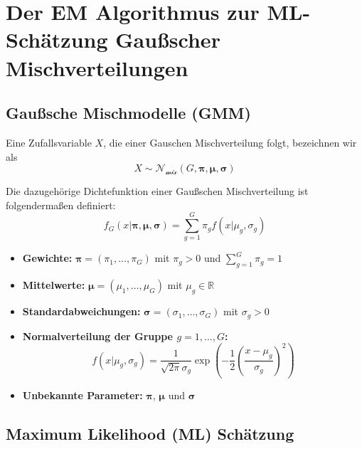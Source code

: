 \documentclass[
  ngerman,
]{book}
\providecommand{\tightlist}{%
  \setlength{\itemsep}{0pt}\setlength{\parskip}{0pt}}
\begin{document}
\hypertarget{der-em-algorithmus-zur-ml-schuxe4tzung-gauuxdfscher-mischverteilungen}{%
\section{Der EM Algorithmus zur ML-Schätzung Gaußscher Mischverteilungen}\label{der-em-algorithmus-zur-ml-schuxe4tzung-gauuxdfscher-mischverteilungen}}

\hypertarget{gauuxdfsche-mischmodelle-gmm}{%
\subsection{Gaußsche Mischmodelle (GMM)}\label{gauuxdfsche-mischmodelle-gmm}}

Eine Zufallsvariable \(X\), die einer Gauschen Mischverteilung folgt, bezeichnen wir als
\[
X\sim\mathcal{N}_{\mathcal{mix}}(G,\boldsymbol{\pi},\boldsymbol{\mu},\boldsymbol{\sigma})
\]

Die dazugehörige Dichtefunktion einer Gaußschen Mischverteilung ist folgendermaßen definiert:
\begin{equation}
f_G(x|\boldsymbol{\pi},\boldsymbol{\mu},\boldsymbol{\sigma})=\sum_{g=1}^G\pi_gf(x|\mu_g,\sigma_g) \label{eq:GMMdens}
\end{equation}

\begin{itemize}
\tightlist
\item
  \textbf{Gewichte:} \(\boldsymbol{\pi}=(\pi_1,\dots,\pi_G)\) mit \(\pi_g>0\) und \(\sum_{g=1}^G\pi_g=1\)
\item
  \textbf{Mittelwerte:} \(\boldsymbol{\mu}=(\mu_1,\dots,\mu_G)\) mit \(\mu_g\in\mathbb{R}\)
\item
  \textbf{Standardabweichungen:} \(\boldsymbol{\sigma}=(\sigma_1,\dots,\sigma_G)\) mit \(\sigma_g>0\)
\item
  \textbf{Normalverteilung der Gruppe \(g=1,\dots,G\):}
  \[
  f(x|\mu_g,\sigma_g)=\frac{1}{\sqrt{2\pi}\sigma_g}\exp\left(-\frac{1}{2}\left(\frac{x-\mu_g}{\sigma_g}\right)^2\right)
  \]
\item
  \textbf{Unbekannte Parameter:} {\(\boldsymbol{\pi}\)}, {\(\boldsymbol{\mu}\)} und {\(\boldsymbol{\sigma}\)}
\end{itemize}

\hypertarget{maximum-likelihood-ml-schuxe4tzung}{%
\subsection{Maximum Likelihood (ML) Schätzung}\label{maximum-likelihood-ml-schuxe4tzung}}
\end{document}
